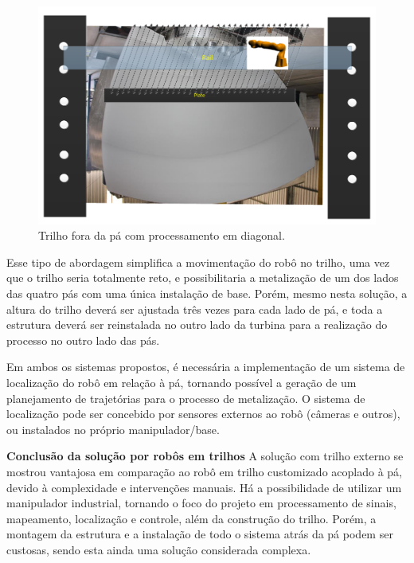 \begin{figure}[h!]
\centering
	\includegraphics[width=\columnwidth]{figs/trilhos/rail2.pdf} 
	\caption{Trilho fora da pá com processamento em diagonal.}
	\label{rail2}
\end{figure}

Esse tipo de abordagem simplifica a movimentação do robô no
trilho, uma vez que o trilho seria totalmente reto, e possibilitaria a
metalização de um dos lados das quatro pás com uma única instalação de base.
Porém, mesmo nesta solução, a altura do trilho deverá ser ajustada três vezes para
cada lado de pá, e toda a estrutura deverá ser reinstalada no outro lado da
turbina para a realização do processo no outro lado das pás.

Em ambos os sistemas propostos, é necessária a implementação de um sistema de
localização do robô em relação à pá, tornando possível a geração de um
planejamento de trajetórias para o processo de metalização. O sistema de
localização pode ser concebido por sensores externos
ao robô (câmeras e outros), ou instalados no próprio manipulador/base.

\textbf{Conclusão da solução por robôs em trilhos}
A solução com trilho externo se mostrou vantajosa em comparação ao robô em
trilho customizado acoplado à pá, devido à complexidade e intervenções
manuais. Há a possibilidade de utilizar um manipulador industrial, tornando o
foco do projeto em processamento de sinais, mapeamento, localização e controle,
além da construção do trilho. Porém, a montagem da estrutura e a instalação de
todo o sistema atrás da pá podem ser custosas, sendo esta ainda uma solução
considerada complexa.